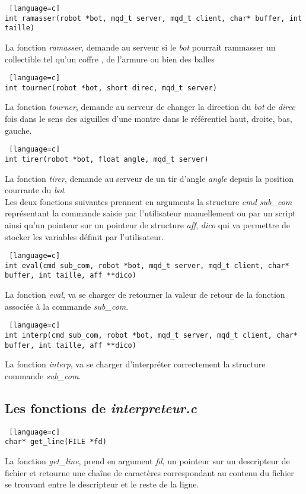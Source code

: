 \documentclass[a4paper, 11pt]{article}
\begin{document}
\begin {lstlisting} [language=c]
int ramasser(robot *bot, mqd_t server, mqd_t client, char* buffer, int taille)
\end{lstlisting}
La fonction \emph{ramasser}, demande au serveur si le \emph{bot} pourrait rammasser un collectible tel qu'un coffre , de l'armure ou bien des balles\\

\begin {lstlisting} [language=c]
int tourner(robot *bot, short direc, mqd_t server)
\end{lstlisting}
La fonction \emph{tourner}, demande au serveur de changer la direction du \emph{bot} de \emph{direc} fois dans le sens des aiguilles d'une montre dans le référentiel haut, droite, bas, gauche.\\

\begin {lstlisting} [language=c]
int tirer(robot *bot, float angle, mqd_t server)
\end{lstlisting}
La fonction \emph{tirer}, demande au serveur de un tir d'angle \emph{angle} depuis la position courrante du  \emph{bot}\\

Les deux fonctions suivantes prennent en arguments la structure \emph{cmd sub\_com} représentant la commande saisie par l'utilisateur manuellement ou par un script ainsi qu'un pointeur sur un pointeur de structure \emph{aff}, \emph{dico} qui va permettre de stocker les variables définit par l'utilisateur.

\begin {lstlisting} [language=c]
int eval(cmd sub_com, robot *bot, mqd_t server, mqd_t client, char* buffer, int taille, aff **dico)
\end{lstlisting}
La fonction \emph{eval}, va se charger de retourner la valeur de retour de la fonction associée à la commande \emph{sub\_com}.\\

\begin {lstlisting} [language=c]
int interp(cmd sub_com, robot *bot, mqd_t server, mqd_t client, char* buffer, int taille, aff **dico)
\end{lstlisting}
La fonction \emph{interp}, va se charger d'interpréter correctement la structure commande \emph{sub\_com}.\\

\subsection{Les fonctions de \emph{interpreteur.c}}
\begin {lstlisting} [language=c]
char* get_line(FILE *fd)
\end{lstlisting}
La fonction \emph{get\_line}, prend en argument \emph{fd}, un pointeur sur un descripteur de fichier et retourne une chaîne de caractères correspondant au contenu du fichier se trouvant entre le descripteur et le reste de la ligne.\\
\end{document}
